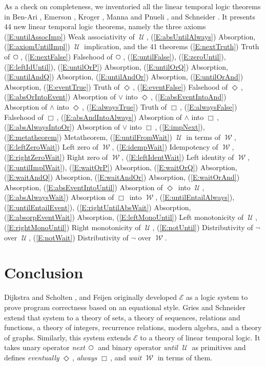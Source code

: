 \documentclass[12pt, fleqn, leqno]{article}
\newcommand{\Until}{\;\mathcal{U}\;}
\newcommand{\Wait}{\;\mathcal{W}\;}
\newcommand{\Next}{\;\,\text{\raisebox{3.5pt}{\circle{6}}}}
\newcommand{\Event}{\Diamond\,}
\newcommand{\Always}{\Box\,}
\begin{document}
As a check on completeness, we inventoried all the linear temporal logic theorems in Ben-Ari \cite{Ben2}, Emerson \cite{Emer}, Kroger \cite{Kroger}, Manna and Pnueli \cite{Manna}, and Schneider \cite{Schn}.
It presents 44 new linear temporal logic theorems, namely the three axioms
(\ref{E:untilAssocImp}) Weak associativity of $\Until$,
(\ref{E:absUntilAlways}) Absorption,
(\ref{E:axiomUntilImpl}) $\Until$ implication,
and the 41 theorems
(\ref{E:nextTruth}) Truth of $\Next$,
(\ref{E:nextFalse}) Falsehood of $\Next$,
(\ref{E:untilFalse}),
(\ref{E:zeroUntil}),
(\ref{E:leftIdUntil}),
(\ref{E:untilOrP}) Absorption,
(\ref{E:untilOrQ}) Absorption,
(\ref{E:untilAndQ}) Absorption,
(\ref{E:untilAndOr}) Absorption,
(\ref{E:untilOrAnd}) Absorption,
(\ref{E:eventTrue}) Truth of $\Event$,
(\ref{E:eventFalse}) Falsehood of $\Event$,
(\ref{E:absOrIntoEvent}) Absorption of $\lor$ into $\Event$,
(\ref{E:absEventIntoAnd}) Absorption of $\land$ into $\Event$,
(\ref{E:alwaysTrue}) Truth of $\Always$,
(\ref{E:alwaysFalse}) Falsehood of $\Always$,
(\ref{E:absAndIntoAlways}) Absorption of $\land$ into $\Always$,
(\ref{E:absAlwaysIntoOr}) Absorption of $\lor$ into $\Always$,
(\ref{E:impNext}),
(\ref{E:metatheorem}) Metatheorem,
(\ref{E:untilFromWait}) $\Until$ in terms of $\Wait$,
(\ref{E:leftZeroWait}) Left zero of $\Wait$,
(\ref{E:idempWait}) Idempotency of $\Wait$,
(\ref{E:rightZeroWait}) Right zero of $\Wait$,
(\ref{E:leftIdentWait}) Left identity of $\Wait$,
(\ref{E:untilImplWait}),
(\ref{E:waitOrP}) Absorption,
(\ref{E:waitOrQ}) Absorption,
(\ref{E:waitAndQ}) Absorption,
(\ref{E:waitAndOr}) Absorption,
(\ref{E:waitOrAnd}) Absorption,
(\ref{E:absEventIntoUntil}) Absorption of $\Event$ into $\Until$,
(\ref{E:absAlwaysWait}) Absorption of $\Always$ into $\Wait$,
(\ref{E:untilEntailAlways}),
(\ref{E:untilEntailEvent}),
(\ref{E:rightUntilAbsWait}) Absorption,
(\ref{E:absorpEventWait}) Absorption,
(\ref{E:leftMonoUntil}) Left monotonicity of $\Until$,
(\ref{E:rightMonoUntil}) Right monotonicity of $\Until$,
(\ref{E:notUntil}) Distributivity of $\neg$ over $\Until$,
(\ref{E:notWait}) Distributivity of $\neg$ over $\Wait$.

\section{Conclusion}

Dijkstra and Scholten \cite{DandS}, and Feijen \cite{Feij} originally developed $\mathcal{E}$ as a logic system to prove
program correctness based on an equational style.
Gries and Schneider extend that system to a theory of sets, a theory of sequences,
relations and functions, a theory of integers, recurrence relations, modern algebra, and a theory of graphs.
Similarly, this system extends $\mathcal{E}$ to a theory of linear temporal logic.
It takes unary operator \textit{next} $\Next$ and binary operator \textit{until} $\Until$ as primitives and defines
\textit{eventually} $\Event$, \textit{always} $\Always$, and \textit{wait} $\Wait$ in terms of them.
\end{document}
